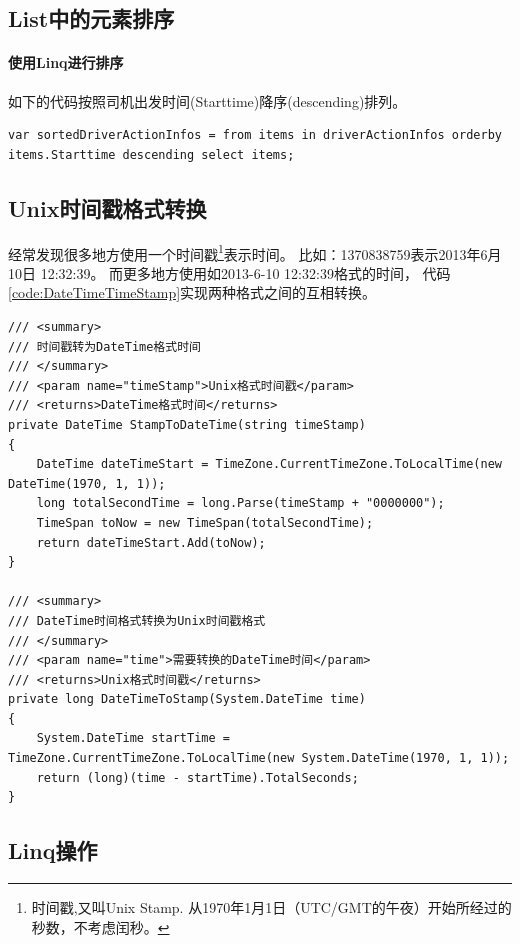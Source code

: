 \documentclass{book}
\begin{document}
\subsection{List中的元素排序}

\paragraph{使用Linq进行排序}

如下的代码按照司机出发时间(Starttime)降序(descending)排列。

\begin{lstlisting}[language={[Sharp]C}]
var sortedDriverActionInfos = from items in driverActionInfos orderby items.Starttime descending select items;
\end{lstlisting}

\subsection{Unix时间戳格式转换}

经常发现很多地方使用一个时间戳\footnote{时间戳,又叫Unix Stamp. 
从1970年1月1日（UTC/GMT的午夜）开始所经过的秒数，不考虑闰秒。}表示时间。
比如：1370838759表示2013年6月10日 12:32:39。
而更多地方使用如2013-6-10 12:32:39格式的时间， 
代码\ref{code:DateTimeTimeStamp}实现两种格式之间的互相转换。

\begin{lstlisting}[language={[Sharp]C},caption=时间戳与DateTime转换,label={code:DateTimeTimeStamp}]
/// <summary>
/// 时间戳转为DateTime格式时间
/// </summary>
/// <param name="timeStamp">Unix格式时间戳</param>
/// <returns>DateTime格式时间</returns> 
private DateTime StampToDateTime(string timeStamp)
{
    DateTime dateTimeStart = TimeZone.CurrentTimeZone.ToLocalTime(new DateTime(1970, 1, 1));
    long totalSecondTime = long.Parse(timeStamp + "0000000");
    TimeSpan toNow = new TimeSpan(totalSecondTime);
    return dateTimeStart.Add(toNow);
}

/// <summary>
/// DateTime时间格式转换为Unix时间戳格式
/// </summary>
/// <param name="time">需要转换的DateTime时间</param>
/// <returns>Unix格式时间戳</returns> 
private long DateTimeToStamp(System.DateTime time)
{
    System.DateTime startTime = TimeZone.CurrentTimeZone.ToLocalTime(new System.DateTime(1970, 1, 1));
    return (long)(time - startTime).TotalSeconds;
}
\end{lstlisting}

\subsection{Linq操作}
\end{document}
